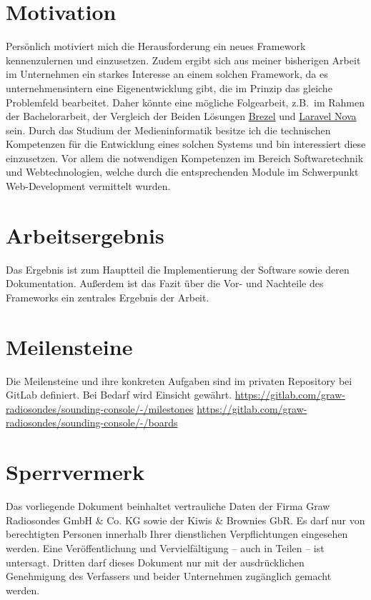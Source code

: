 \documentclass[a4paper,11pt]{article}%
\renewcommand{\\}{\vspace*{0.5\baselineskip} \newline}
\begin{document}
    \section{Motivation}
    Persönlich motiviert mich die Herausforderung ein neues Framework kennenzulernen und einzusetzen.
    Zudem ergibt sich aus meiner bisherigen Arbeit im Unternehmen ein starkes Interesse an einem solchen Framework, da es unternehmensintern eine Eigenentwicklung gibt, die im Prinzip das gleiche Problemfeld bearbeitet.
    Daher könnte eine mögliche Folgearbeit, z.B.\ im Rahmen der Bachelorarbeit, der Vergleich der Beiden Lösungen \href{https://brezel.io}{Brezel} und \href{https://nova.laravel.com}{Laravel Nova} sein.
    \\
    Durch das Studium der Medieninformatik besitze ich die technischen Kompetenzen für die Entwicklung eines solchen Systems und bin interessiert diese einzusetzen.
    Vor allem die notwendigen Kompetenzen im Bereich Softwaretechnik und Webtechnologien, welche durch die entsprechenden Module im Schwerpunkt Web-Development vermittelt wurden.


    \section{Arbeitsergebnis}
    Das Ergebnis ist zum Hauptteil die Implementierung der Software sowie deren Dokumentation.
    Außerdem ist das Fazit über die Vor- und Nachteile des Frameworks ein zentrales Ergebnis der Arbeit.


    \section{Meilensteine}
    Die Meilensteine und ihre konkreten Aufgaben sind im privaten Repository bei GitLab definiert.
    Bei Bedarf wird Einsicht gewährt.
    \newline
    \href{hthttps://gitlab.com/graw-radiosondes/sounding-console/-/milestones}{https://gitlab.com/graw-radiosondes/sounding-console/-/milestones}
    \newline
    \href{hthttps://gitlab.com/graw-radiosondes/sounding-console/-/boards}{https://gitlab.com/graw-radiosondes/sounding-console/-/boards}


    \section{Sperrvermerk}
    Das vorliegende Dokument beinhaltet vertrauliche Daten der Firma Graw Radiosondes GmbH \& Co. KG sowie der Kiwis \& Brownies GbR\@.
    Es darf nur von berechtigten Personen innerhalb Ihrer dienstlichen Verpflichtungen eingesehen werden.
    Eine Veröffentlichung und Vervielfältigung – auch in Teilen – ist untersagt.
    Dritten darf dieses Dokument nur mit der ausdrücklichen Genehmigung des Verfassers und beider Unternehmen zugänglich gemacht werden.
\end{document}

